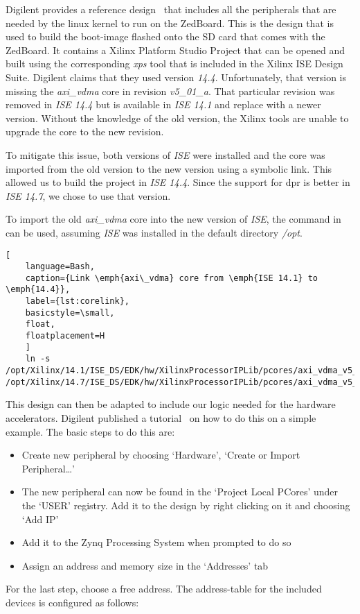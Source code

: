 Digilent provides a reference design~\cite{DigilentReferenceDesign} that
includes all the peripherals that are needed by the linux kernel to run on the
ZedBoard.
This is the design that is used to build the boot-image flashed onto the SD
card that comes with the ZedBoard.
It contains a Xilinx Platform Studio Project that can be opened and built using
the corresponding \emph{xps} tool that is included in the Xilinx ISE Design
Suite.
Digilent claims that they used version \emph{14.4}. Unfortunately, that version
is missing the \emph{axi\_vdma} core in revision \emph{v5\_01\_a}.
That particular revision was removed in \emph{ISE 14.4} but is available in
\emph{ISE 14.1} and replace with a newer version.
Without the knowledge of the old version, the Xilinx tools are unable to upgrade
the core to the new revision.

To mitigate this issue, both versions of \emph{ISE} were installed and the core
was imported from the old version to the new version using a symbolic link.
This allowed us to build the project in \emph{ISE 14.4}.
Since the support for \gls{dpr} is better in \emph{ISE 14.7}, we chose to use
that version.

To import the old \emph{axi\_vdma} core into the new version of \emph{ISE}, the
command in  can be used, assuming \emph{ISE} was installed in
the default directory \emph{/opt}.
\begin{lstlisting}[
	language=Bash,
	caption={Link \emph{axi\_vdma} core from \emph{ISE 14.1} to \emph{14.4}},
	label={lst:corelink},
	basicstyle=\small,
	float,
	floatplacement=H
	]
	ln -s /opt/Xilinx/14.1/ISE_DS/EDK/hw/XilinxProcessorIPLib/pcores/axi_vdma_v5_01_a /opt/Xilinx/14.7/ISE_DS/EDK/hw/XilinxProcessorIPLib/pcores/axi_vdma_v5_01_a
\end{lstlisting}

This design can then be adapted to include our logic needed for the hardware
accelerators.
Digilent published a tutorial~\cite{DigilentTutorial} on how to do this on a
simple example.
The basic steps to do this are:
\begin{itemize}
	\item Create new peripheral by choosing `Hardware', `Create or Import
		Peripheral\ldots'
	\item The new peripheral can now be found in the `Project Local PCores'
		under the `USER' registry.
		Add it to the design by right clicking on it and choosing `Add IP'
	\item Add it to the Zynq Processing System when prompted to do so
	\item Assign an address and memory size in the `Addresses' tab
\end{itemize}
For the last step, choose a free address.
The address-table for the included devices is configured as follows:

